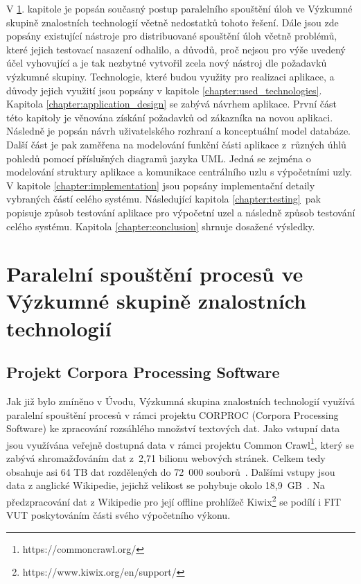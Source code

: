  V \ref{chapter:act_state_analysis}. kapitole je popsán současný postup paralelního spouštění úloh ve Výzkumné skupině znalostních technologií včetně nedostatků tohoto řešení. Dále jsou zde popsány existující nástroje pro distribuované spouštění úloh včetně problémů, které jejich testovací nasazení odhalilo, a důvodů, proč nejsou pro výše uvedený účel vyhovující a je tak nezbytné vytvořil zcela nový nástroj dle požadavků výzkumné skupiny. Technologie, které budou využity pro realizaci aplikace, a důvody jejich využití jsou popsány v kapitole \ref{chapter:used_technologies}. Kapitola \ref{chapter:application_design} se zabývá návrhem aplikace. První část této kapitoly je věnována získání požadavků od zákazníka na novou aplikaci. Následně je popsán návrh uživatelského rozhraní a konceptuální model databáze. Další část je pak zaměřena na modelování funkční části aplikace z~různých úhlů pohledů pomocí příslušných diagramů jazyka UML. Jedná se zejména o modelování struktury aplikace a komunikace centrálního uzlu s výpočetními uzly. V kapitole \ref{chapter:implementation} jsou popsány implementační detaily vybraných částí celého systému. Následující kapitola \ref{chapter:testing}~pak popisuje způsob testování aplikace pro výpočetní uzel a následně způsob testování celého systému. Kapitola \ref{chapter:conclusion} shrnuje dosažené výsledky.


\chapter{Paralelní spouštění procesů ve Výzkumné skupině znalostních technologií}
\label{chapter:act_state_analysis}

\section{Projekt Corpora Processing Software}
Jak již bylo zmíněno v Úvodu, Výzkumná skupina znalostních technologií využívá paralelní spouštění procesů v rámci projektu CORPROC (Corpora Processing Software) ke zpracování rozsáhlého množství textových dat. Jako vstupní data jsou využívána veřejně dostupná data v rámci projektu Common Crawl\footnote{https://commoncrawl.org/}, který se zabývá shromažďováním dat z~2,71 bilionu webových stránek. Celkem tedy obsahuje asi 64 TB dat rozdělených do 72~000 souborů~\cite{CommonCrawlDatabase}. Dalšími vstupy jsou data z anglické Wikipedie, jejichž velikost se pohybuje okolo 18,9~GB~\cite{WikipediaSize}. Na předzpracování dat z Wikipedie pro její offline prohlížeč Kiwix\footnote{https://www.kiwix.org/en/support/} se podílí i FIT VUT poskytováním části svého výpočetního výkonu.

